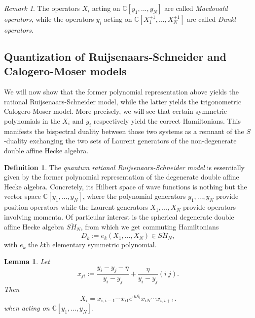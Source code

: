 \documentclass[11pt]{report}
\newtheorem{lemma}[theorem]{Lemma}
\theoremstyle{definition}
\newtheorem{definition}[theorem]{Definition}
\theoremstyle{remark}
\newtheorem*{remark}{Remark}
\theoremstyle{remark}
\newcommand{\C}{\mathbb{C}}
\newcommand{\I}{\mathrm{i}}
\begin{document}
\begin{remark}
The operators $X_i$ acting on $\C[y_1,...,y_N]$ are called \emph{Macdonald operators}, while the operators $y_i$ acting on $\C[X_1^{\pm 1},...,X_N^{\pm 1}]$ are called \emph{Dunkl operators}.
\end{remark}

\subsection{Quantization of Ruijsenaars-Schneider and Calogero-Moser models}

We will now show that the former polynomial representation above yields the rational Ruijsenaars-Schneider model, while the latter yields the trigonometric Calogero-Moser model. More precisely, we will see that certain symmetric polynomials in the $X_i$ and $y_i$ respectively yield the correct Hamiltonians. This manifests the bispectral duality between those two systems \cite{article:chalykh:2000} as a remnant of the $S$-duality exchanging the two sets of Laurent generators of the non-degenerate double affine Hecke algebra.

\begin{definition}
The \emph{quantum rational Ruijsenaars-Schneider model} is essentially given by the former polynomial representation of the degenerate double affine Hecke algebra. Concretely, its Hilbert space of wave functions is nothing but the vector space $\C[y_1,...,y_N]$, where the polynomial generators $y_1,...,y_N$ provide position operators while the Laurent generators $X_1,...,X_N$ provide operators involving momenta. Of particular interest is the spherical degenerate double affine Hecke algebra $S\ddot H_N$, from which we get commuting Hamiltonians
\begin{equation*}
D_k := e_k(X_1,...,X_N) \in S\ddot H_N,
\end{equation*}
with $e_k$ the $k$th elementary symmetric polynomial.
\end{definition}

\begin{lemma}
Let
\begin{equation*}
x_{ji} := \frac{y_i-y_j-\eta}{y_i-y_j} + \frac{\eta}{y_i-y_j} (i \ j).
\end{equation*}
Then
\begin{equation*}
X_i = x_{i,i-1} \cdots x_{i1} e^{\I \hbar \partial_i} x_{iN} \cdots x_{i,i+1}.
\end{equation*}
when acting on $\C[y_1,...,y_N]$.
\end{lemma}
\end{document}
